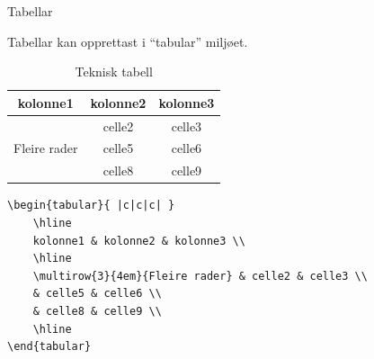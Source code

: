 \begin{frame}[containsverbatim]{Tabellar}
	
	Tabellar kan opprettast i ``tabular'' miljøet.
	
	\begin{table}
		\caption{Teknisk tabell}
		\begin{tabular}{ |c|c|c| } 
			\hline
			kolonne1 & kolonne2 & kolonne3 \\
			\hline
			\multirow{3}{4em}{Fleire rader} & celle2 & celle3 \\ 
			& celle5 & celle6 \\ 
			& celle8 & celle9 \\ 
			\hline
		\end{tabular}
	\end{table}
	
	\begin{verbatim}
\begin{tabular}{ |c|c|c| } 
	\hline
	kolonne1 & kolonne2 & kolonne3 \\
	\hline
	\multirow{3}{4em}{Fleire rader} & celle2 & celle3 \\ 
	& celle5 & celle6 \\ 
	& celle8 & celle9 \\ 
	\hline
\end{tabular}
	\end{verbatim}
	
\end{frame}

%	
%	
